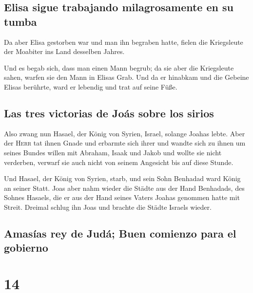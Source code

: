 \hypertarget{elisa-sigue-trabajando-milagrosamente-en-su-tumba}{%
\subsection{Elisa sigue trabajando milagrosamente en su
tumba}\label{elisa-sigue-trabajando-milagrosamente-en-su-tumba}}

 Da aber Elisa gestorben war und man ihn begraben hatte,
fielen die Kriegsleute der Moabiter ins Land desselben Jahres.

 Und es begab sich, dass man einen Mann begrub; da sie
aber die Kriegsleute sahen, warfen sie den Mann in Elisas Grab. Und da
er hinabkam und die Gebeine Elisas berührte, ward er lebendig und trat
auf seine Füße.

\hypertarget{las-tres-victorias-de-jouxe1s-sobre-los-sirios}{%
\subsection{Las tres victorias de Joás sobre los
sirios}\label{las-tres-victorias-de-jouxe1s-sobre-los-sirios}}

 Also zwang nun Hasael, der König von Syrien, Israel,
solange Joahas lebte.  Aber der \textsc{Herr} tat ihnen
Gnade und erbarmte sich ihrer und wandte sich zu ihnen um seines Bundes
willen mit Abraham, Isaak und Jakob und wollte sie nicht verderben,
verwarf sie auch nicht von seinem Angesicht bis auf diese Stunde.

 Und Hasael, der König von Syrien, starb, und sein Sohn
Benhadad ward König an seiner Statt.  Joas aber nahm
wieder die Städte aus der Hand Benhadads, des Sohnes Hasaels, die er aus
der Hand seines Vaters Joahas genommen hatte mit Streit. Dreimal schlug
ihn Joas und brachte die Städte Israels wieder.

\hypertarget{amasuxedas-rey-de-juduxe1-buen-comienzo-para-el-gobierno}{%
\subsection{Amasías rey de Judá; Buen comienzo para el
gobierno}\label{amasuxedas-rey-de-juduxe1-buen-comienzo-para-el-gobierno}}

\hypertarget{section-13}{%
\section{14}\label{section-13}}

